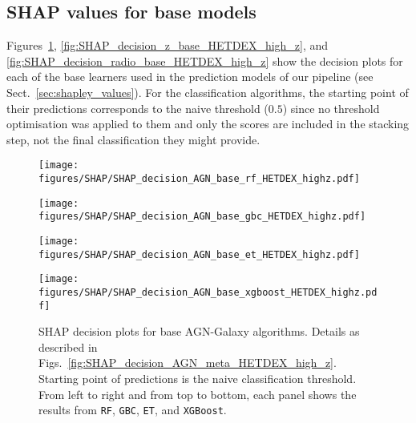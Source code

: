\documentclass{aa}
\begin{document}
\begin{appendix}
\section{SHAP values for base models}\label{sec:app_shap_base}

Figures~\ref{fig:SHAP_decision_AGN_base_HETDEX_high_z}, \ref{fig:SHAP_decision_z_base_HETDEX_high_z}, and \ref{fig:SHAP_decision_radio_base_HETDEX_high_z} show the decision plots for each of the base learners used in the prediction models of our pipeline (see Sect.~\ref{sec:shapley_values}). For the classification algorithms, the starting point of their predictions corresponds to the naive threshold ($0.5$) since no threshold optimisation was applied to them and only the scores are included in the stacking step, not the final classification they might provide.

\begin{figure}
  \centering
  \begin{minipage}{0.44\columnwidth}
    \centering
    \texttt{[image: figures/SHAP/SHAP\_decision\_AGN\_base\_rf\_HETDEX\_highz.pdf]}
  \end{minipage}%
  \hfill
  \begin{minipage}{0.44\columnwidth}
    \centering
    \texttt{[image: figures/SHAP/SHAP\_decision\_AGN\_base\_gbc\_HETDEX\_highz.pdf]}
  \end{minipage}\break%
  \begin{minipage}{0.44\columnwidth}
    \centering
    \texttt{[image: figures/SHAP/SHAP\_decision\_AGN\_base\_et\_HETDEX\_highz.pdf]}
  \end{minipage}%
  \hfill
  \begin{minipage}{0.44\columnwidth}
    \centering
    \texttt{[image: figures/SHAP/SHAP\_decision\_AGN\_base\_xgboost\_HETDEX\_highz.pdf]}
  \end{minipage}
  \caption{SHAP decision plots for base AGN-Galaxy algorithms. Details as described in Figs.~\ref{fig:SHAP_decision_AGN_meta_HETDEX_high_z}. Starting point of predictions is the naive classification threshold. From left to right and from top to bottom, each panel shows the results from \texttt{RF}, \texttt{GBC}, \texttt{ET}, and \texttt{XGBoost}.}
  \label{fig:SHAP_decision_AGN_base_HETDEX_high_z}
\end{figure}


\end{appendix}
\end{document}
